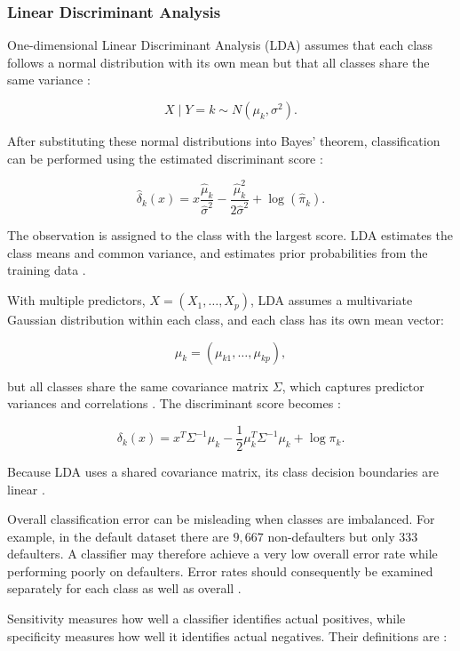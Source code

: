 \documentclass[11pt,letterpaper,reqno]{amsart}
\numberwithin{equation}{subsection}
\theoremstyle{definition}
\numberwithin{thm}{subsection}
\begin{document}
\subsubsection{Linear Discriminant Analysis}
\label{sec:lda_theory}
One-dimensional Linear Discriminant Analysis (LDA) assumes that each class follows a normal distribution with its own mean but that all classes share the same variance \cite[Section 4.4.1, pp. 147--148]{James:2023}:

\[
X\mid Y=k \sim N(\mu_k,\sigma^2).
\]

After substituting these normal distributions into Bayes' theorem, classification can be performed using the estimated discriminant score \cite[Equation 4.22, p. 149]{James:2023}:

\[
\hat{\delta}_k(x)
=
x\frac{\hat{\mu}_k}{\hat{\sigma}^2}
-
\frac{\hat{\mu}_k^2}{2\hat{\sigma}^2}
+
\log(\hat{\pi}_k).
\]

The observation is assigned to the class with the largest score. LDA estimates the class means and common variance, and estimates prior probabilities from the training data \cite[Equations 4.20--4.21, p. 149]{James:2023}.

With multiple predictors, $X=(X_1,\ldots,X_p)$, LDA assumes a multivariate Gaussian distribution within each class, and each class has its own mean vector:

\[
\mu_k=(\mu_{k1},\ldots,\mu_{kp}),
\]

but all classes share the same covariance matrix $\Sigma$, which captures predictor variances and correlations \cite[Section 4.4.2, pp. 150--151]{James:2023}. The discriminant score becomes \cite[Equation 4.24, p. 151]{James:2023}:

\[
\delta_k(x)
=
x^T\Sigma^{-1}\mu_k
-
\frac{1}{2}\mu_k^T\Sigma^{-1}\mu_k
+
\log\pi_k.
\]

Because LDA uses a shared covariance matrix, its class decision boundaries are linear \cite[Section 4.4.2, pp. 151--152]{James:2023}.

Overall classification error can be misleading when classes are imbalanced. For example, in the default dataset there are $9{,}667$ non-defaulters but only $333$ defaulters. A classifier may therefore achieve a very low overall error rate while performing poorly on defaulters. Error rates should consequently be examined separately for each class as well as overall \cite[Section 4.4.1, p. 153]{James:2023}.

Sensitivity measures how well a classifier identifies actual positives, while specificity measures how well it identifies actual negatives. Their definitions are \cite[Table 4.7, p. 156]{James:2023}:
\end{document}
